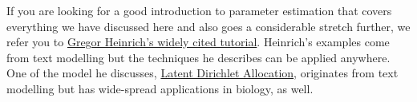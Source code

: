 If you are looking for a good introduction to
parameter estimation that covers everything we have discussed here and also goes a considerable stretch further, we refer you to 
\href{http://www.arbylon.net/publications/text-est.pdf}{Gregor Heinrich's widely cited tutorial}. Heinrich's examples come from text modelling but the techniques he
describes can be applied anywhere. One of the model he discusses, \href{https://en.wikipedia.org/wiki/Latent_Dirichlet_allocation}{Latent Dirichlet Allocation}, originates
from text modelling but has wide-spread applications in biology, as well.


